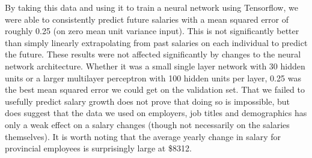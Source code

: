 \documentclass{article}
\begin{document}
By taking this data and using it to train a neural network using Tensorflow, we
were able to consistently predict future salaries with a mean squared error of
roughly 0.25 (on zero mean unit variance input). This is not significantly
better than simply linearly extrapolating from past salaries on each individual
to predict the future. These results were not affected significantly by changes
to the neural network architecture. Whether it was a small single layer network
with 30 hidden units or a larger multilayer perceptron with 100 hidden units
per layer, 0.25 was the best mean squared error we could get on the validation
set.  That we failed to usefully predict salary growth does not prove that
doing so is impossible, but does suggest that the data we used on employers,
job titles and demographics has only a weak effect on a salary changes (though
not necessarily on the salaries themselves). It is worth noting that the 
average yearly change in salary for provincial employees is surprisingly large at
\$8312.




\end{document}
